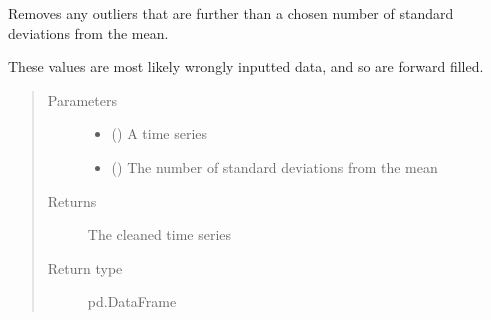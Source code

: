 \documentclass[letterpaper,10pt,english]{sphinxmanual}
\begin{document}
\begin{fulllineitems}
\label{\detokenize{preprocessing:Foresight.preprocessing.clean_data}}
Removes any outliers that are further than a chosen
number of standard deviations from the mean.

These values are most likely wrongly inputted data,
and so are forward filled.
\begin{quote}\begin{description}
\item[{Parameters}] \leavevmode\begin{itemize}
\item {} 
 () \textendash{} A time series

\item {} 
 () \textendash{} The number of standard deviations from the mean

\end{itemize}

\item[{Returns}] \leavevmode
The cleaned time series

\item[{Return type}] \leavevmode
pd.DataFrame

\end{description}\end{quote}

\end{fulllineitems}

\end{document}

